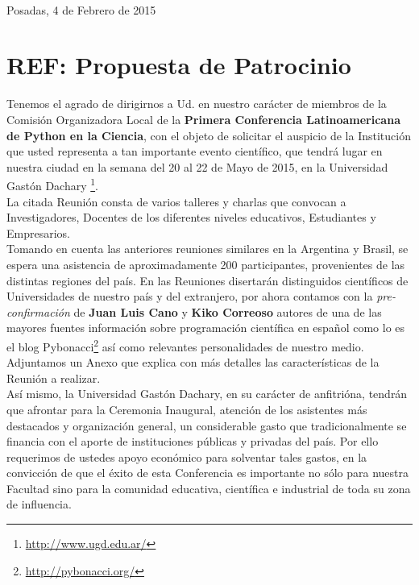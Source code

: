 \documentclass[11pt,a4paper]{report}
\begin{document}
\hfill \\[0.2cm] Posadas, 4 de Febrero de 2015\\[0.4cm]

\section*{REF: Propuesta de Patrocinio}

Tenemos el agrado de dirigirnos a Ud. en nuestro carácter de miembros de la Comisión Organizadora Local de la \textbf{Primera Conferencia Latinoamericana de Python en la Ciencia}, con el objeto de solicitar el auspicio de la Institución que usted representa a tan importante evento científico, que tendrá lugar en nuestra ciudad en la semana del 20 al 22 de Mayo de 2015, en la Universidad Gastón Dachary
\footnote{\url{http://www.ugd.edu.ar/}}. \\
        La citada Reunión consta de varios talleres y charlas  que convocan a
        Investigadores, Docentes de los diferentes niveles educativos,
        Estudiantes  y Empresarios. \\[0.2cm]

        Tomando en cuenta las anteriores reuniones similares en la Argentina y
        Brasil, se espera una asistencia de aproximadamente 200 participantes,
        provenientes de las distintas regiones del país. En las Reuniones
        disertarán distinguidos científicos de Universidades de nuestro país y
        del extranjero, por ahora contamos con la \emph{pre-confirmación} de
        \textbf{Juan Luis Cano} y \textbf{Kiko Correoso} autores de una de las
        mayores fuentes información sobre programación científica en español
        como lo es el blog Pybonacci\footnote{\url{http://pybonacci.org/}} así
        como relevantes personalidades de nuestro medio. Adjuntamos un Anexo
        que explica con más detalles las características de la
        Reunión a realizar.\\[0.2cm]

        Así mismo, la Universidad Gastón Dachary,  en su carácter de
        anfitrióna, tendrán que afrontar para la Ceremonia Inaugural, atención
        de los asistentes más destacados y organización general, un
        considerable gasto que tradicionalmente se financia con el aporte de
        instituciones públicas y privadas del país. Por ello requerimos de
        ustedes apoyo económico para solventar tales gastos, en la convicción
        de que el éxito de esta Conferencia es importante no sólo para nuestra
        Facultad sino para la comunidad educativa, científica e industrial de
        toda su zona de influencia.
\end{document}
